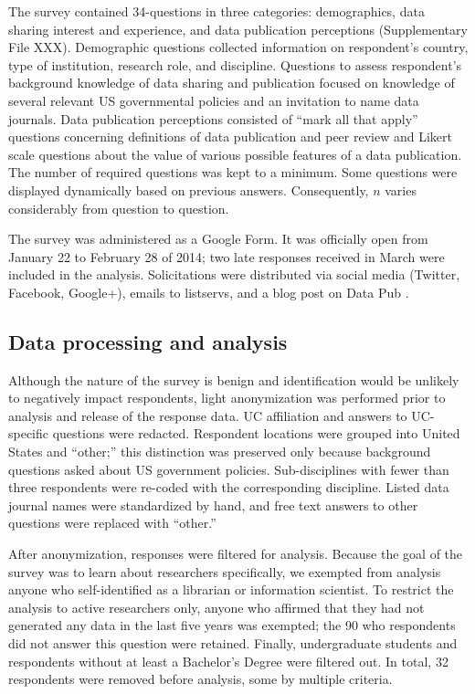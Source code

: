 \documentclass[10pt]{article}
\begin{document}
The survey contained 34-questions in three categories: demographics, data sharing interest and experience, and data publication perceptions (Supplementary File XXX).
Demographic questions collected information on respondent's country, type of institution, research role, and discipline.
Questions to assess respondent's background knowledge of data sharing and publication focused on knowledge of several relevant US governmental policies and an invitation to name data journals.
Data publication perceptions consisted of ``mark all that apply'' questions concerning definitions of data publication and peer review and Likert scale questions about the value of various possible features of a data publication.
The number of required questions was kept to a minimum.
Some questions were displayed dynamically based on previous answers. 
Consequently, $n$ varies considerably from question to question.

The survey was administered as a Google Form.
It was officially open from January 22 to February 28 of 2014; two late responses received in March were included in the analysis.
Solicitations were distributed via social media (Twitter, Facebook, Google+), emails to listservs, and a blog post on Data Pub \cite{kratz_data_2014}.

\subsection*{Data processing and analysis}
Although the nature of the survey is benign and identification would be unlikely to negatively impact respondents, light anonymization was performed prior to analysis and release of the response data.
UC affiliation and answers to UC-specific questions were redacted.
Respondent locations were grouped into United States and ``other;'' this distinction was preserved only because background questions asked about US government policies.  
Sub-disciplines with fewer than three respondents were re-coded with the corresponding discipline.
Listed data journal names were standardized by hand, and free text answers to other questions were replaced with ``other.''

After anonymization, responses were filtered for analysis.
Because the goal of the survey was to learn about researchers specifically, we exempted from analysis anyone who self-identified as a librarian or information scientist.
To restrict the analysis to active researchers only, anyone who affirmed that they had not generated any data in the last five years was exempted; the 90 who respondents did not answer this question were retained.
Finally, undergraduate students and respondents without at least a Bachelor's Degree were filtered out.
In total, 32 respondents were removed before analysis, some by multiple criteria.
\end{document}
